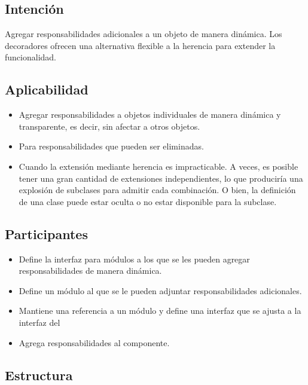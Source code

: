 \subsection*{Intención}
Agregar responsabilidades adicionales a un objeto de manera dinámica. Los decoradores ofrecen una alternativa flexible a la herencia para extender la funcionalidad.

\subsection*{Aplicabilidad}
\begin{itemize}
\item Agregar responsabilidades a objetos individuales de manera dinámica y transparente, es decir, sin afectar a otros objetos.
\item Para responsabilidades que pueden ser eliminadas.
\item Cuando la extensión mediante herencia es impracticable. A veces, es posible tener una gran cantidad de extensiones independientes, lo que produciría una explosión de subclases para admitir cada combinación. O bien, la definición de una clase puede estar oculta o no estar disponible para la subclase.
\end{itemize}

\subsection*{Participantes}

\begin{itemize}
\item \Componente Define la interfaz para módulos a los que se les pueden agregar responsabilidades de manera dinámica.
\item \ComponenteConcreto Define un módulo al que se le pueden adjuntar responsabilidades adicionales.
\item \Decorador Mantiene una referencia a un módulo \Componente y define una interfaz que se ajusta a la interfaz del \Componente
\item \DecoradorConcreto Agrega responsabilidades al componente.
\end{itemize}


\subsection*{Estructura}

